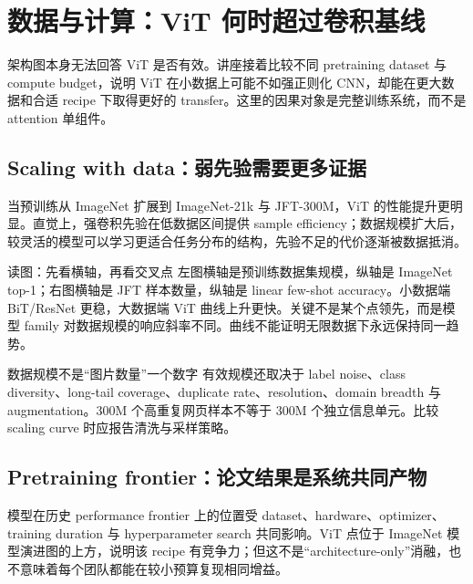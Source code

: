 \section{数据与计算：ViT 何时超过卷积基线}

架构图本身无法回答 ViT 是否有效。讲座接着比较不同 pretraining dataset 与 compute budget，说明 ViT 在小数据上可能不如强正则化 CNN，却能在更大数据和合适 recipe 下取得更好的 transfer。这里的因果对象是完整训练系统，而不是 attention 单组件。

\subsection{Scaling with data：弱先验需要更多证据}

当预训练从 ImageNet 扩展到 ImageNet-21k 与 JFT-300M，ViT 的性能提升更明显。直觉上，强卷积先验在低数据区间提供 sample efficiency；数据规模扩大后，较灵活的模型可以学习更适合任务分布的结构，先验不足的代价逐渐被数据抵消。


\begin{knowledgebox}{读图：先看横轴，再看交叉点}
左图横轴是预训练数据集规模，纵轴是 ImageNet top-1；右图横轴是 JFT 样本数量，纵轴是 linear few-shot accuracy。小数据端 BiT/ResNet 更稳，大数据端 ViT 曲线上升更快。关键不是某个点领先，而是模型 family 对数据规模的响应斜率不同。曲线不能证明无限数据下永远保持同一趋势。
\end{knowledgebox}

\begin{warningbox}{数据规模不是“图片数量”一个数字}
有效规模还取决于 label noise、class diversity、long-tail coverage、duplicate rate、resolution、domain breadth 与 augmentation。300M 个高重复网页样本不等于 300M 个独立信息单元。比较 scaling curve 时应报告清洗与采样策略。
\end{warningbox}

\subsection{Pretraining frontier：论文结果是系统共同产物}

模型在历史 performance frontier 上的位置受 dataset、hardware、optimizer、training duration 与 hyperparameter search 共同影响。ViT 点位于 ImageNet 模型演进图的上方，说明该 recipe 有竞争力；但这不是“architecture-only”消融，也不意味着每个团队都能在较小预算复现相同增益。

